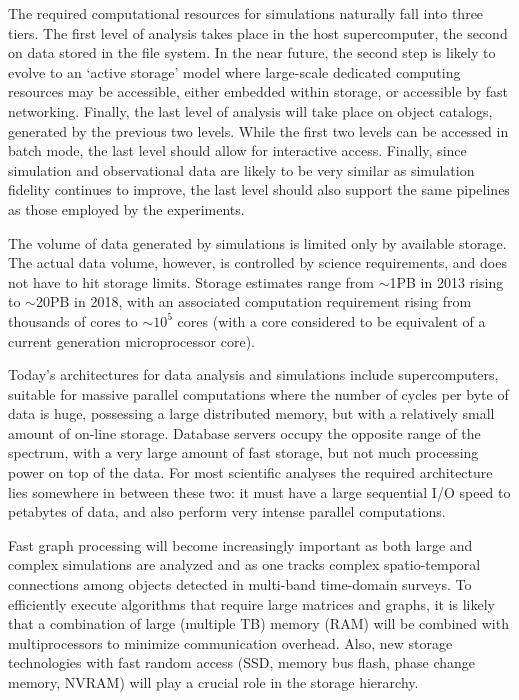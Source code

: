 \medskip


The required computational resources for simulations naturally fall
into three tiers. The first level of analysis takes place in the host
supercomputer, the second on data stored in the file system. In the
near future, the second step is likely to evolve to an `active
storage' model where large-scale dedicated computing resources may be
accessible, either embedded within storage, or accessible by fast
networking. Finally, the last level of analysis will take place on
object catalogs, generated by the previous two levels. While the first
two levels can be accessed in batch mode, the last level should allow
for interactive access. Finally, since simulation and observational
data are likely to be very similar as simulation fidelity continues to
improve, the last level should also support the same pipelines as
those employed by the experiments.

The volume of data generated by simulations is limited only by
available storage. The actual data volume, however, is controlled by
science requirements, and does not have to hit storage limits. Storage
estimates range from $\sim$1PB in 2013 rising to $\sim$20PB in 2018,
with an associated computation requirement rising from thousands of
cores to $\sim 10^5$ cores (with a core considered to be equivalent of
a current generation microprocessor core).

\medskip


Today's architectures for data analysis and simulations include
supercomputers, suitable for massive parallel computations where the
number of cycles per byte of data is huge, possessing a large
distributed memory, but with a relatively small amount of on-line
storage. Database servers occupy the opposite range of the spectrum,
with a very large amount of fast storage, but not much processing
power on top of the data. For most scientific analyses the required
architecture lies somewhere in between these two: it must have a large
sequential I/O speed to petabytes of data, and also perform very
intense parallel computations. 

Fast graph processing will become increasingly important as both large
and complex simulations are analyzed and as one tracks complex
spatio-temporal connections among objects detected in multi-band
time-domain surveys. To efficiently execute algorithms that require
large matrices and graphs, it is likely that a combination of large
(multiple TB) memory (RAM) will be combined with multiprocessors to
minimize communication overhead. Also, new storage technologies with
fast random access (SSD, memory bus flash, phase change memory, NVRAM)
will play a crucial role in the storage hierarchy.

